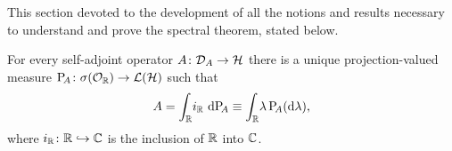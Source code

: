 
This section devoted to the development of all the notions and results necessary to understand and prove the spectral theorem, stated below. 

\begin{theorem}
For every self-adjoint operator $A\colon \mathcal{D}_A\to \mathcal{H}$ there is a unique projection-valued measure $\mathrm{P}_{\negmedspace A}\colon \sigma(\mathcal{O}_{\mathbb{R}})\to\mathcal{L}(\mathcal{H})$ such that
\begin{equation*}
A = \int_{\mathbb{R}}\! i_{\mathbb{R}} \, \mathop{}\!\mathrm{d} \mathrm{P}_{\negmedspace A} \equiv \int_{\mathbb{R}}\! \lambda \, \mathrm{P}_{\negmedspace A}(\mathop{}\!\mathrm{d} \lambda),
\end{equation*}
where $i_{\mathbb{R}}\colon \mathbb{R}\hookrightarrow \mathbb{C}$ is the inclusion of $\mathbb{R}$ into $\mathbb{C}$.
\end{theorem}

